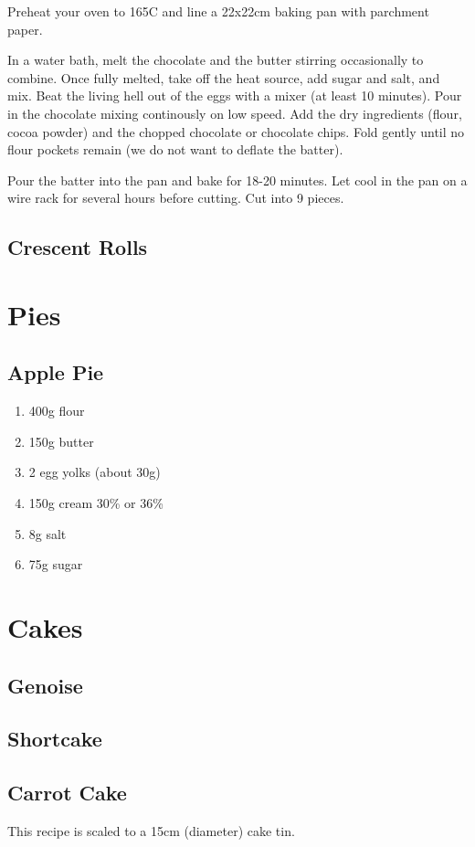 \documentclass[11pt]{report}
\begin{document}
Preheat your oven to 165C and line a 22x22cm baking pan with parchment paper.

In a water bath, melt the chocolate and the butter stirring occasionally to
combine. Once fully melted, take off the heat source, add sugar and salt, and
mix. Beat the living hell out of the eggs with a mixer (at least 10 minutes).
Pour in the chocolate mixing continously on low speed. Add the dry ingredients
(flour, cocoa powder) and the chopped chocolate or chocolate chips. Fold gently
until no flour pockets remain (we do not want to deflate the batter).

Pour the batter into the pan and bake for 18-20 minutes. Let cool in the pan on
a wire rack for several hours before cutting. Cut into 9 pieces.

\section{Crescent Rolls}

\chapter{Pies}
\section{Apple Pie}
\begin{enumerate}
  \item 400g flour
  \item 150g butter
  \item 2 egg yolks (about 30g)
  \item 150g cream 30\% or 36\%
  \item 8g salt
  \item 75g sugar
\end{enumerate}

\chapter{Cakes}
\section{Genoise}
\section{Shortcake}

\section{Carrot Cake}
This recipe is scaled to a 15cm (diameter) cake tin.
\end{document}
